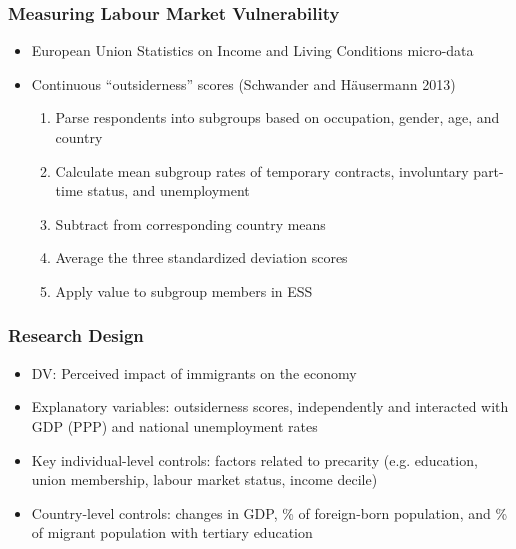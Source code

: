 \documentclass[14pt]{beamer}
\begin{document}
\begin{frame}
	\frametitle{Measuring Labour Market Vulnerability}
	\begin{itemize}
		\item European Union Statistics on Income and Living Conditions micro-data
		\pause
		\item Continuous ``outsiderness'' scores (Schwander and Häusermann 2013) 
		\begin{enumerate}
			\pause
			\item Parse respondents into subgroups based on occupation, gender, age, and country
			\pause
			\item Calculate mean subgroup rates of temporary contracts, involuntary part-time status, and unemployment
			\pause
			\item Subtract from corresponding country means 
			\pause
			\item Average the three standardized deviation scores
			\pause
			\item Apply value to subgroup members in ESS
		\end{enumerate}
	\end{itemize}
\end{frame}

\begin{frame}
	\frametitle{Research Design}
	\begin{itemize}[<+-| alert@+>]
		\item<1-> \alert<+>{DV:} Perceived impact of immigrants on the economy
		\item<2-> \alert<+>{Explanatory variables:} outsiderness scores, independently and interacted with GDP (PPP) and national unemployment rates
		\item<3-> \alert<+>{Key individual-level controls:} factors related to precarity (e.g. education, union membership, labour market status, income decile)
		\item<4-> \alert<+>{Country-level controls:} changes in GDP, \% of foreign-born population, and \% of migrant population with tertiary education
	\end{itemize}
\end{frame}
\end{document}
